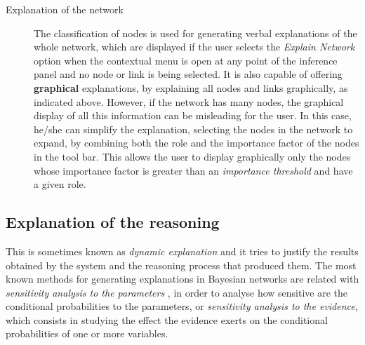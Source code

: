 \begin{description}
\item [Explanation of the network]
The classification of nodes is used for generating verbal
explanations of the whole network, which are displayed if the user
selects the \emph{Explain Network} option when the contextual menu
is open at any point of the inference panel and no node or link is
being selected. It is also capable of offering \textbf{graphical}
explanations, by explaining all nodes and links graphically, as
indicated above. However, if the network has many nodes, the
graphical display of all this information can be misleading for
the user. In this case, he/she can simplify the explanation,
selecting the nodes in the network to expand, by combining both
the role and the importance factor of the nodes in the tool bar.
This allows the user to display graphically only the nodes whose
importance factor is greater than an \emph{importance threshold}
and have a given role.
\end{description}

\subsection{Explanation of the reasoning} \label{sec:dynamic}This is sometimes
known as \textit{dynamic explanation} \cite{Henrion90} and it
tries to justify the results obtained by the system and the
reasoning process that produced them. The most known methods for
generating explanations in Bayesian networks \cite{lacave02} are
related with \emph{sensitivity analysis to the parameters}
\cite{Castillo97, Chan02, Coupe00, Laskey95}, in order to analyse
how sensitive are the conditional probabilities to the parameters,
or \emph{sensitivity analysis to the evidence,}
\cite{jensen-book2001, Suermondt92} which consists in studying the
effect the evidence exerts on the conditional probabilities of one
or more variables.

